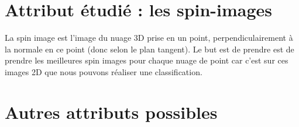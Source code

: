 \section{Attribut étudié : les spin-images}

	La spin image est l’image du nuage 3D prise en un point, perpendiculairement à la normale en ce point (donc selon le plan tangent). Le but est de prendre est de prendre les meilleures spin images pour chaque nuage de point car c’est sur ces images 2D que nous pouvons réaliser une classification.




\section{Autres attributs possibles}
